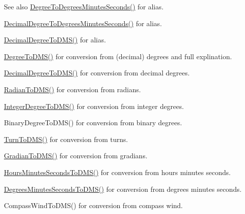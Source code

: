 \begin{DoxySeeAlso}{See also}
\mbox{\hyperlink{group___e_g_x_math-_conversions-_angle_conversions-_degree_ga859585939255d52d010c780c68eb6e23}{Degree\+To\+Degrees\+Minutes\+Seconds()}} for alias. 

\mbox{\hyperlink{group___e_g_x_math-_conversions-_angle_conversions-_decimal_degree_gac5a5255c8d120f71b60d8f60de1a1b6e}{Decimal\+Degree\+To\+Degrees\+Minutes\+Seconds()}} for alias. 

\mbox{\hyperlink{group___e_g_x_math-_conversions-_angle_conversions-_decimal_degree_ga64a1b298ce16e9edf3209b678a7bed46}{Decimal\+Degree\+To\+D\+M\+S()}} for alias. 

\mbox{\hyperlink{group___e_g_x_math-_conversions-_angle_conversions-_degree_ga1096d04647918e20f61fb184ba2a7dce}{Degree\+To\+D\+M\+S()}} for conversion from (decimal) degrees and full explination. 

\mbox{\hyperlink{group___e_g_x_math-_conversions-_angle_conversions-_decimal_degree_ga64a1b298ce16e9edf3209b678a7bed46}{Decimal\+Degree\+To\+D\+M\+S()}} for conversion from decimal degrees. 

\mbox{\hyperlink{group___e_g_x_math-_conversions-_angle_conversions-_radian_gaf80be0c5c65ccaa5544a08a7754f3575}{Radian\+To\+D\+M\+S()}} for conversion from radians. 

\mbox{\hyperlink{group___e_g_x_math-_conversions-_angle_conversions-_integer_degree_gaf76779bcc23268b41d4c3a7610d60eaf}{Integer\+Degree\+To\+D\+M\+S()}} for conversion from integer degrees. 

Binary\+Degree\+To\+D\+M\+S() for conversion from binary degrees. 

\mbox{\hyperlink{group___e_g_x_math-_conversions-_angle_conversions-_turn_ga6ca011c0ae55ae079402080d7a1b4010}{Turn\+To\+D\+M\+S()}} for conversion from turns. 

\mbox{\hyperlink{group___e_g_x_math-_conversions-_angle_conversions-_gradian_ga0b6700b55ab4a24fa581bf2af0dafdaa}{Gradian\+To\+D\+M\+S()}} for conversion from gradians. 

\mbox{\hyperlink{group___e_g_x_math-_conversions-_angle_conversions-_hours_minutes_seconds_ga8fe72f56eebb44d7e8d7033476bbdd9b}{Hours\+Minutes\+Seconds\+To\+D\+M\+S()}} for conversion from hours minutes seconds. 

\mbox{\hyperlink{group___e_g_x_math-_conversions-_angle_conversions-_degrees_minutes_seconds_gae6652ea4b358b3f35f6b7c18faffabb2}{Degrees\+Minutes\+Seconds\+To\+D\+M\+S()}} for conversion from degrees minutes seconds. 

Compass\+Wind\+To\+D\+M\+S() for conversion from compass wind. 
\end{DoxySeeAlso}
\mbox{\label{group___e_g_x_math-_conversions-_angle_conversions-_degree_ga87c3fab0867021e5d2501197b4db6194}} 
